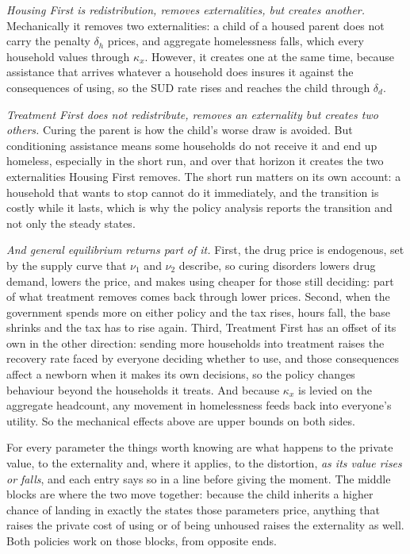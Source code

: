 \documentclass[10pt]{article}
\begin{document}
\emph{Housing First is redistribution, removes externalities, but
creates another.}
Mechanically it removes two externalities: a child of a housed parent does not
carry the penalty $\delta_h$ prices, and aggregate homelessness falls, which every
household values through $\kappa_x$. However, it creates one at the same time,
because assistance that arrives whatever a household does insures it against the
consequences of using, so the SUD rate rises and reaches the child through
$\delta_d$.

\emph{Treatment First does not redistribute, removes an
externality but creates two others.} Curing the parent is how the child's worse draw is avoided.
But conditioning assistance means some households do not receive it
and end up homeless, especially in the short run, and
over that horizon it creates the two externalities Housing First removes. The short
run matters on its own account: a household that wants to stop cannot do it
immediately, and the transition is costly while it lasts, which is why the
policy analysis reports the transition and not only the steady states.

\emph{And general equilibrium returns part of it.} First, the drug price is
endogenous, set by the supply curve that $\nu_1$ and $\nu_2$ describe, so curing
disorders lowers drug demand, lowers the price, and makes using cheaper for those
still deciding: part of what treatment removes comes back through
lower prices. Second, when the government spends more on
either policy and the tax rises, hours fall, the base
shrinks and the tax has to rise again. Third, Treatment First has an offset of
its own in the other direction: sending more households into treatment raises the
recovery rate faced by everyone deciding whether to use, and those
consequences affect a newborn when it makes its own decisions, so the policy
changes behaviour beyond the households it treats. And because $\kappa_x$ is levied on the
aggregate headcount, any movement in homelessness feeds back into everyone's
utility. So the mechanical effects above are upper bounds on both sides.

\medskip

\noindent For every parameter the things worth knowing are what
happens to the private value, to the externality and, where it applies, to the
distortion, \emph{as its value rises or falls}, and each entry says so in a line before giving the
moment. The middle blocks are where the two move
together: because the child inherits a higher chance of landing in exactly the
states those parameters price, anything that raises the private cost of using or of
being unhoused raises the externality as well. Both policies work on those blocks,
from opposite ends.
\end{document}
